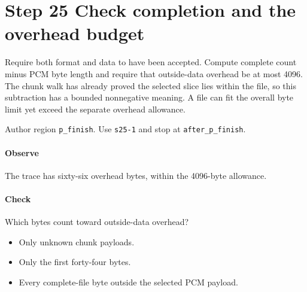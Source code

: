 \section{Step 25 Check completion and the overhead budget}\label{pcm-wav-s25}
Require both format and data to have been accepted. Compute complete count minus PCM byte length and require that outside-data overhead be at most 4096. The chunk walk has already proved the selected slice lies within the file, so this subtraction has a bounded nonnegative meaning. A file can fit the overall byte limit yet exceed the separate overhead allowance.

Author region \texttt{p\_finish}. Use \texttt{s25-1} and stop at \texttt{after\_p\_finish}.

\paragraph{Observe} The trace has sixty-six overhead bytes, within the 4096-byte allowance.

\paragraph{Check} Which bytes count toward outside-data overhead?
\begin{itemize}
  \item[A.] Only unknown chunk payloads.
  \item[B.] Only the first forty-four bytes.
  \item[C.] Every complete-file byte outside the selected PCM payload.
\end{itemize}
